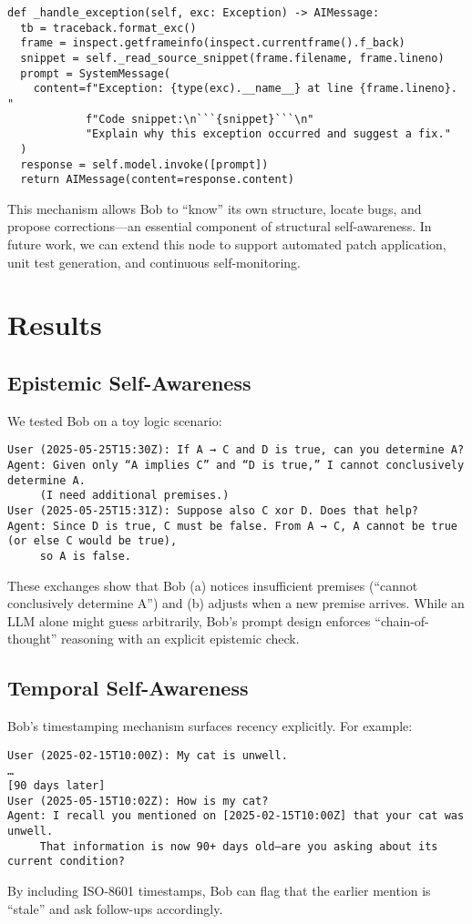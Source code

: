 \documentclass[11pt]{article}
\begin{document}
\begin{verbatim}
def _handle_exception(self, exc: Exception) -> AIMessage:
  tb = traceback.format_exc()
  frame = inspect.getframeinfo(inspect.currentframe().f_back)
  snippet = self._read_source_snippet(frame.filename, frame.lineno)
  prompt = SystemMessage(
    content=f"Exception: {type(exc).__name__} at line {frame.lineno}. "
            f"Code snippet:\n```{snippet}```\n"
            "Explain why this exception occurred and suggest a fix."
  )
  response = self.model.invoke([prompt])
  return AIMessage(content=response.content)
\end{verbatim}

This mechanism allows Bob to “know” its own structure, locate bugs, and propose corrections—an essential component of structural self-awareness. In future work, we can extend this node to support automated patch application, unit test generation, and continuous self-monitoring.

\section{Results}

\subsection{Epistemic Self-Awareness}
We tested Bob on a toy logic scenario:
\begin{verbatim}
User (2025-05-25T15:30Z): If A → C and D is true, can you determine A?
Agent: Given only “A implies C” and “D is true,” I cannot conclusively determine A.
     (I need additional premises.)
User (2025-05-25T15:31Z): Suppose also C xor D. Does that help?
Agent: Since D is true, C must be false. From A → C, A cannot be true (or else C would be true),
     so A is false.
\end{verbatim}
These exchanges show that Bob (a) notices insufficient premises (“cannot conclusively determine A”) and (b) adjusts when a new premise arrives. While an LLM alone might guess arbitrarily, Bob’s prompt design enforces “chain-of-thought” reasoning with an explicit epistemic check.

\subsection{Temporal Self-Awareness}
Bob’s timestamping mechanism surfaces recency explicitly. For example:
\begin{verbatim}
User (2025-02-15T10:00Z): My cat is unwell.
…
[90 days later]
User (2025-05-15T10:02Z): How is my cat?
Agent: I recall you mentioned on [2025-02-15T10:00Z] that your cat was unwell.
     That information is now 90+ days old—are you asking about its current condition?
\end{verbatim}
By including ISO-8601 timestamps, Bob can flag that the earlier mention is “stale” and ask follow-ups accordingly.
\end{document}
